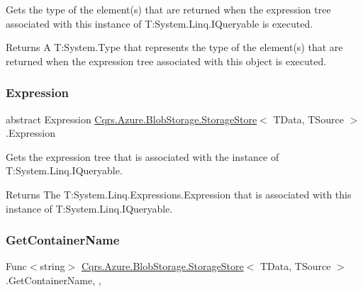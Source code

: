 Gets the type of the element(s) that are returned when the expression tree associated with this instance of T\+:\+System.\+Linq.\+I\+Queryable is executed. 

\begin{DoxyReturn}{Returns}
A T\+:\+System.\+Type that represents the type of the element(s) that are returned when the expression tree associated with this object is executed. 
\end{DoxyReturn}
\mbox{\label{classCqrs_1_1Azure_1_1BlobStorage_1_1StorageStore_a21c204b514718b8af550ce2a627c4b70_a21c204b514718b8af550ce2a627c4b70}} 
\subsubsection{\texorpdfstring{Expression}{Expression}}
{\footnotesize\ttfamily abstract Expression \hyperlink{classCqrs_1_1Azure_1_1BlobStorage_1_1StorageStore}{Cqrs.\+Azure.\+Blob\+Storage.\+Storage\+Store}$<$ T\+Data, T\+Source $>$.Expression\hspace{0.3cm}{\ttfamily [get]}}



Gets the expression tree that is associated with the instance of T\+:\+System.\+Linq.\+I\+Queryable. 

\begin{DoxyReturn}{Returns}
The T\+:\+System.\+Linq.\+Expressions.\+Expression that is associated with this instance of T\+:\+System.\+Linq.\+I\+Queryable. 
\end{DoxyReturn}
\mbox{\label{classCqrs_1_1Azure_1_1BlobStorage_1_1StorageStore_acc1c1e865c9a59772a29cfe44d39e48a_acc1c1e865c9a59772a29cfe44d39e48a}} 
\subsubsection{\texorpdfstring{Get\+Container\+Name}{GetContainerName}}
{\footnotesize\ttfamily Func$<$string$>$ \hyperlink{classCqrs_1_1Azure_1_1BlobStorage_1_1StorageStore}{Cqrs.\+Azure.\+Blob\+Storage.\+Storage\+Store}$<$ T\+Data, T\+Source $>$.Get\+Container\+Name\hspace{0.3cm}{\ttfamily [get]}, {\ttfamily [set]}, {\ttfamily [protected]}}

